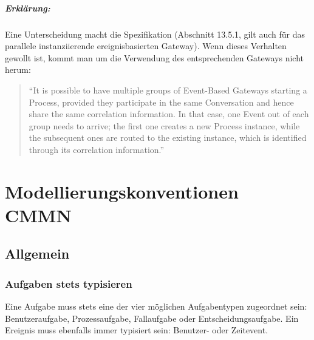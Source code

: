 \documentclass[12pt,report]{snetTeaching}
\begin{document}
\begin{Rahmen}
	\hfill
\end{Rahmen}


\paragraph{Erklärung:} Eine Unterscheidung macht die Spezifikation (Abschnitt 13.5.1, gilt auch für das parallele instanziierende ereignisbasierten Gateway). Wenn dieses Verhalten gewollt ist, kommt man um die Verwendung des entsprechenden Gateways nicht herum:
\begin{quote}
“It is possible to have multiple groups of Event-Based Gateways starting a Process, provided they participate in the same Conversation and hence share the same correlation information. In that case, one Event out of each group needs to arrive; the first one creates a new Process instance, while the subsequent ones are routed to the existing instance, which is identified through its correlation information.” 
\end{quote}





\chapter{Modellierungskonventionen CMMN}




\section{Allgemein}





\subsection{Aufgaben stets typisieren}

Eine Aufgabe muss stets eine der vier möglichen Aufgabentypen zugeordnet sein: Benutzeraufgabe, Prozessaufgabe, Fallaufgabe oder Entscheidungsaufgabe. Ein Ereignis muss ebenfalls immer typisiert sein: Benutzer- oder Zeitevent.
\end{document}
